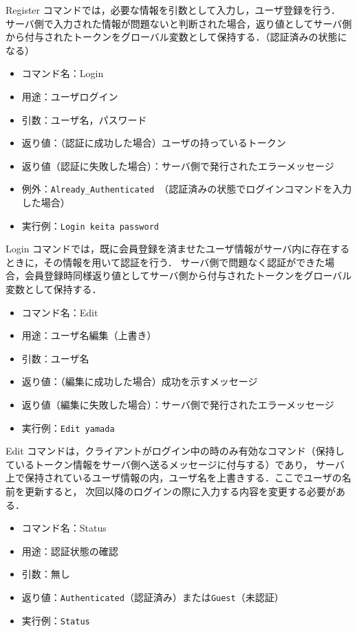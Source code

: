 \documentclass[11pt]{jsarticle}
\begin{document}
Register コマンドでは，必要な情報を引数として入力し，ユーザ登録を行う．
サーバ側で入力された情報が問題ないと判断された場合，返り値としてサーバ側から付与されたトークンをグローバル変数として保持する．（認証済みの状態になる）

\begin{itemize}
  \item コマンド名：Login
  \item 用途：ユーザログイン
  \item 引数：ユーザ名，パスワード
  \item 返り値：（認証に成功した場合）ユーザの持っているトークン
  \item 返り値（認証に失敗した場合）：サーバ側で発行されたエラーメッセージ
  \item 例外：{\tt Already\_Authenticated }（認証済みの状態でログインコマンドを入力した場合）
  \item 実行例：{\tt Login keita password}
\end{itemize}

Login コマンドでは，既に会員登録を済ませたユーザ情報がサーバ内に存在するときに，その情報を用いて認証を行う．
サーバ側で問題なく認証ができた場合，会員登録時同様返り値としてサーバ側から付与されたトークンをグローバル変数として保持する．

\begin{itemize}
  \item コマンド名：Edit
  \item 用途：ユーザ名編集（上書き）
  \item 引数：ユーザ名
  \item 返り値：（編集に成功した場合）成功を示すメッセージ
  \item 返り値（編集に失敗した場合）：サーバ側で発行されたエラーメッセージ
  \item 実行例：{\tt Edit yamada}
\end{itemize}

Edit コマンドは，クライアントがログイン中の時のみ有効なコマンド（保持しているトークン情報をサーバ側へ送るメッセージに付与する）であり，
サーバ上で保持されているユーザ情報の内，ユーザ名を上書きする．ここでユーザの名前を更新すると，
次回以降のログインの際に入力する内容を変更する必要がある．

\begin{itemize}
  \item コマンド名：Status
  \item 用途：認証状態の確認
  \item 引数：無し
  \item 返り値：{\tt Authenticated}（認証済み）または{\tt Guest}（未認証）
  \item 実行例：{\tt Status}
\end{itemize}
\end{document}

